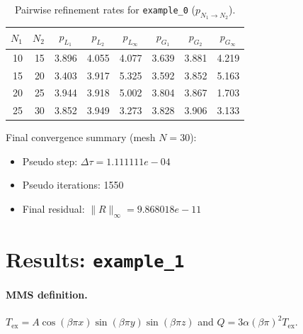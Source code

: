 \documentclass[11pt,a4paper]{article}
\begin{document}
\begin{table}[htbp]
\centering
\caption{Pairwise refinement rates for \texttt{example\_0} ($p_{N_1\to N_2}$).}
\label{tab:pair-example-0}
\scriptsize
\begin{tabular}{rrcccccc}
\toprule
$N_1$ & $N_2$ & $p_{L_1}$ & $p_{L_2}$ & $p_{L_\infty}$ & $p_{G_1}$ & $p_{G_2}$ & $p_{G_\infty}$ \\
\midrule
10 & 15 & 3.896 & 4.055 & 4.077 & 3.639 & 3.881 & 4.219 \\
15 & 20 & 3.403 & 3.917 & 5.325 & 3.592 & 3.852 & 5.163 \\
20 & 25 & 3.944 & 3.918 & 5.002 & 3.804 & 3.867 & 1.703 \\
25 & 30 & 3.852 & 3.949 & 3.273 & 3.828 & 3.906 & 3.133 \\
\bottomrule
\end{tabular}
\end{table}
\noindent Final convergence summary (mesh $N=30$):
\begin{itemize}
\item Pseudo step: $\Delta\tau=1.111111e-04$
\item Pseudo iterations: 1550
\item Final residual: $\|R\|_\infty=9.868018e-11$
\end{itemize}
\section{Results: \texttt{example\_1}}
\paragraph{MMS definition.}
$T_{\mathrm{ex}} = A\cos(\beta\pi x)\sin(\beta\pi y)\sin(\beta\pi z)$ and $Q = 3\alpha(\beta\pi)^2 T_{\mathrm{ex}}$.
\end{document}
